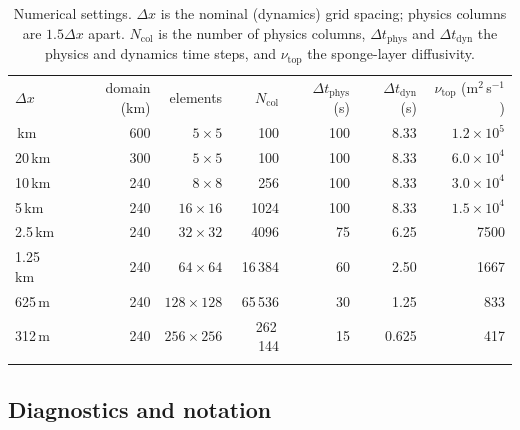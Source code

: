 \documentclass[acp, manuscript]{copernicus}
\newcommand{\dx}{\Delta x}
\providecommand{\DIFaddbegin}{} %
\providecommand{\DIFaddend}{} %
\providecommand{\DIFdelend}{} %
\begin{document}
\DIFdelend \DIFaddbegin \begin{table}[t]
\caption{Numerical settings. $\dx$ is the nominal (dynamics) grid spacing; physics columns are $1.5\dx$ apart. $N_\mathrm{col}$ is the number of physics columns, $\Delta t_\mathrm{phys}$ and $\Delta t_\mathrm{dyn}$ the physics and dynamics time steps, and $\nu_\mathrm{top}$ the sponge-layer diffusivity.}\label{tab:numerics}
\begin{tabular}{lrrrrrr}
\tophline
$\dx$ & domain (km) & elements & $N_\mathrm{col}$ & $\Delta t_\mathrm{phys}$ (s) & $\Delta t_\mathrm{dyn}$ (s) & $\nu_\mathrm{top}$ (m$^2$\,s$^{-1}$) \\
\middlehline
40\,km & 600 & $5\times5$ & 100 & 100 & 8.33 & $1.2\times10^5$ \\
20\,km & 300 & $5\times5$ & 100 & 100 & 8.33 & $6.0\times10^4$ \\
10\,km & 240 & $8\times8$ & 256 & 100 & 8.33 & $3.0\times10^4$ \\
5\,km & 240 & $16\times16$ & 1024 & 100 & 8.33 & $1.5\times10^4$ \\
2.5\,km & 240 & $32\times32$ & 4096 & 75 & 6.25 & 7500 \\
1.25\,km & 240 & $64\times64$ & 16\,384 & 60 & 2.50 & 1667 \\
625\,m & 240 & $128\times128$ & 65\,536 & 30 & 1.25 & 833 \\
312\,m & 240 & $256\times256$ & 262\,144 & 15 & 0.625 & 417 \\
\bottomhline
\end{tabular}
\end{table}
\DIFaddend 

\subsection{Diagnostics and notation}\label{sec:diag}
\end{document}

